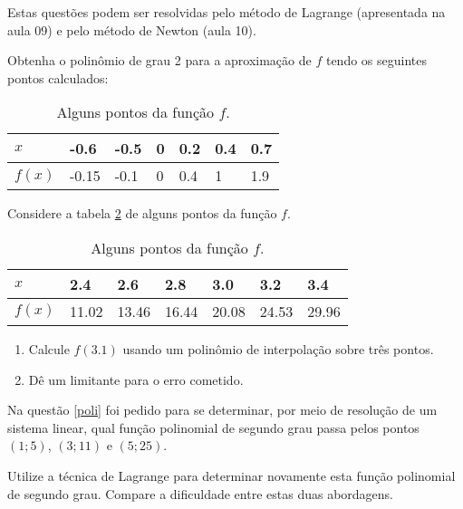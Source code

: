 Estas questões podem ser resolvidas pelo método de Lagrange (apresentada na aula 09) e pelo método de Newton (aula 10).




%
\begin{ex}
Obtenha o polinômio de grau 2 para a aproximação de $f$ tendo os seguintes pontos calculados:
\begin{table}[htb]
\centering
\caption{Alguns pontos da função $f$.}
\label{fx}
\begin{tabular}{@{}lllllll@{}}
\toprule
$x$    & -0.6  & -0.5 & 0 & 0.2 & 0.4 & 0.7 \\ \midrule
$f(x)$ & -0.15 & -0.1 & 0 & 0.4 & 1   & 1.9 \\ \bottomrule
\end{tabular}
\end{table}
\end{ex}

\begin{ex}
Considere a tabela \ref{exp} de alguns pontos da função $f$.
\begin{table}[htb]
\centering
\caption{Alguns pontos da função $f$.}
\label{exp}
\begin{tabular}{@{}lllllll@{}}
\toprule
$x$    & 2.4  & 2.6 & 2.8 & 3.0 & 3.2 & 3.4 \\ \midrule
$f(x)$ & 11.02 & 13.46 & 16.44 & 20.08 & 24.53   & 29.96 \\ \bottomrule
\end{tabular}
\end{table}
\begin{enumerate}
\item Calcule $f(3.1)$ usando um polinômio de interpolação sobre três pontos.
\item Dê um limitante para o erro cometido.
\end{enumerate}
\end{ex}



\begin{ex}
Na questão \ref{poli} foi pedido para se determinar, por meio de resolução de um sistema linear, qual função polinomial de segundo grau passa pelos pontos $(1;5)$, $(3;11)$ e $(5;25)$. 

Utilize a técnica de Lagrange para determinar novamente esta função polinomial de segundo grau. Compare a dificuldade entre estas duas abordagens.
\end{ex}



